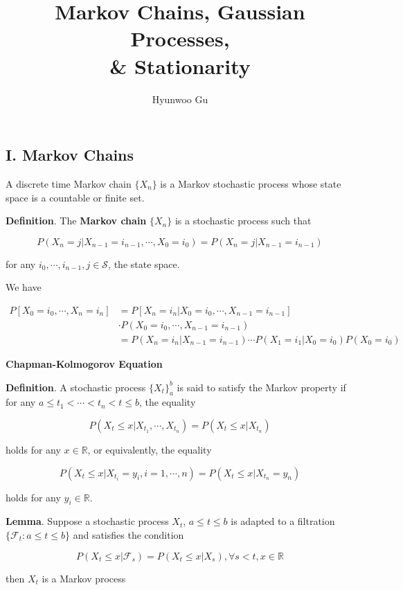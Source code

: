 \documentclass[12pt]{article}
\theoremstyle{nonumberbreak}
\begin{document}
\title{\textbf{Markov Chains, Gaussian Processes, \\ \& Stationarity}}
\author{Hyunwoo Gu}
\date{}

\maketitle


\begin{center}
\section*{I. Markov Chains}
\end{center}
\setcounter{section}{1}

A discrete time Markov chain $\{ X_n \}$ is a Markov stochastic process whose state space is a countable or finite set. 

\bigskip

\begin{theorem}
\textbf{Definition}. The \textbf{Markov chain} $\{X_n\}$ is a stochastic process such that

$$
P(X_n = j | X_{n-1} = i_{n-1}, \cdots, X_0 = i_0) = P(X_n = j | X_{n-1} = i_{n-1})
$$

for any $i_0, \cdots, i_{n-1}, j \in \mathcal{S}$, the state space. 
\end{theorem}


We have

$$
\begin{aligned}
P\left[ X_0 = i_0, \cdots, X_n = i_n \right] &= P[X_n = i_n | X_0 = i_0, \cdots, X_{n-1} = i_{n-1}] \\[8pt]
&\cdot P(X_0 = i_0, \cdots, X_{n-1} = i_{n-1}) \\[8pt]
&= P(X_n = i_n | X_{n-1} = i_{n-1}) \cdots P(X_1 = i_1 | X_0 = i_0) P(X_0 = i_0)
\end{aligned}
$$


\pagebreak
\textbf{Chapman-Kolmogorov Equation}


\begin{theorem}
\textbf{Definition}. A stochastic process $\{X_t \}_a^b$ is said to satisfy the Markov property if for any $a \le t_1 < \cdots < t_n < t \le b$, the equality 

$$
P(X_t \le x | X_{t_1}, \cdots, X_{t_n} ) = P(X_t \le x | X_{t_n})
$$

holds for any $x \in \mathbb{R}$, or equivalently, the equality

$$
P(X_t \le x | X_{t_i} = y_i, i=1,\cdots,n ) = P(X_t \le x | X_{t_n} = y_n)
$$

holds for any $y_i \in \mathbb{R}$. 

\textbf{Lemma}. Suppose a stochastic process $X_t$, $a \le t \le b$ is adapted to a filtration $\{\mathcal{F}_t : a \le t \le b \}$ and satisfies the condition

$$
P (X_t \le x | \mathcal{F}_s) = P(X_t \le x | X_s), \forall s < t, x\in \mathbb{R}
$$

then $X_t$ is a Markov process
\end{theorem}
\end{document}
